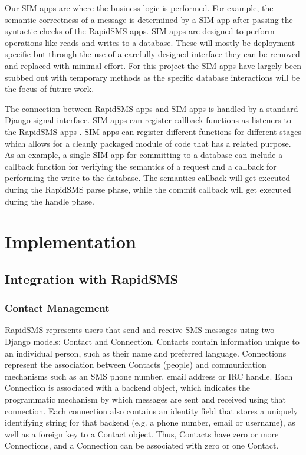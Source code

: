 \documentclass{acm_proc_article-sp}
\begin{document}
Our SIM apps are where the business logic is performed. For example, the semantic correctness of a message is determined by a SIM app after passing the syntactic checks of the RapidSMS apps. SIM apps are designed to perform operations like reads and writes to a database. These will mostly be deployment specific but through the use of a carefully designed interface they can be removed and replaced with minimal effort. For this project the SIM apps have largely been stubbed out with temporary methods as the specific database interactions will be the focus of future work.

The connection between RapidSMS apps and SIM apps is handled by a standard Django signal interface. SIM apps can register callback functions as listeners to the RapidSMS apps \cite{django:signals}. SIM apps can register different functions for different stages which allows for a cleanly packaged module of code that has a related purpose. As an example, a single SIM app for committing to a database can include a callback function for verifying the semantics of a request and a callback for performing the write to the database. The semantics callback will get executed during the RapidSMS parse phase, while the commit callback will get executed during the handle phase.

\section{Implementation}

\subsection{Integration with RapidSMS}

\subsubsection{Contact Management}

RapidSMS represents users that send and receive SMS messages using two Django models: Contact and Connection. Contacts contain information unique to an individual person, such as their name and preferred language. Connections represent the association between Contacts (people) and communication mechanisms such as an SMS phone number, email address or IRC handle. Each Connection is associated with a backend object, which indicates the programmatic mechanism by which messages are sent and received using that connection. Each connection also contains an identity field that stores a uniquely identifying string for that backend (e.g. a phone number, email or username), as well as a foreign key to a Contact object. Thus, Contacts have zero or more Connections, and a Connection can be associated with zero or one Contact.
\end{document}

